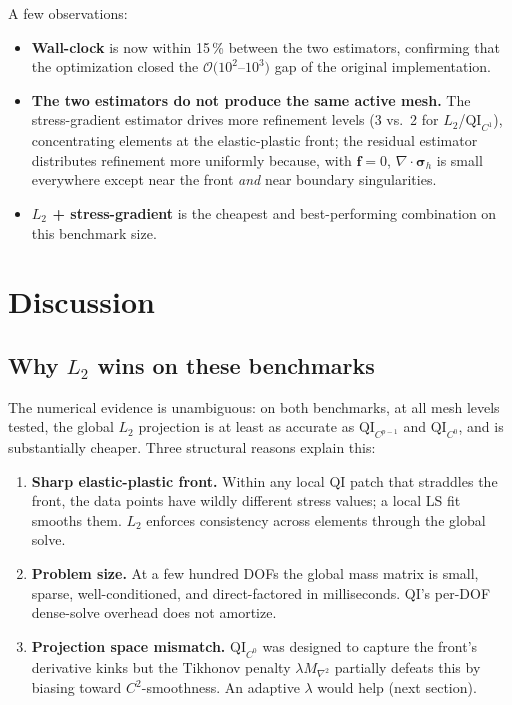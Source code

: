 \documentclass[11pt,a4paper]{article}
\newcommand{\bsigma}{\boldsymbol{\sigma}}
\newcommand{\bff}{\mathbf{f}}
\newcommand{\divg}{\nabla \cdot}
\begin{document}
A few observations:
\begin{itemize}[leftmargin=2em]
    \item \textbf{Wall-clock} is now within 15\,\% between the two
    estimators, confirming that the optimization closed the
    $\mathcal{O}(10^2$--$10^3)$ gap of the original implementation.
    \item \textbf{The two estimators do not produce the same active
    mesh.}  The stress-gradient estimator drives more refinement
    levels (3 vs.~2 for $L_2$/$\mathrm{QI}_{C^1}$), concentrating
    elements at the elastic-plastic front; the residual estimator
    distributes refinement more uniformly because, with $\bff = 0$,
    $\divg\bsigma_h$ is small everywhere except near the front
    \emph{and} near boundary singularities.
    \item \textbf{$L_2$ + stress-gradient} is the cheapest and
    best-performing combination on this benchmark size.
\end{itemize}

\section{Discussion}\label{sec:discussion}

\subsection{Why $L_2$ wins on these benchmarks}

The numerical evidence is unambiguous: on both benchmarks, at all mesh
levels tested, the global $L_2$ projection is at least as accurate as
$\mathrm{QI}_{C^{p-1}}$ and $\mathrm{QI}_{C^0}$, and is substantially
cheaper.  Three structural reasons explain this:

\begin{enumerate}
    \item \textbf{Sharp elastic-plastic front.}  Within any local QI
    patch that straddles the front, the data points have wildly
    different stress values; a local LS fit smooths them.  $L_2$ enforces
    consistency across elements through the global solve.

    \item \textbf{Problem size.}  At a few hundred DOFs the global mass
    matrix is small, sparse, well-conditioned, and direct-factored in
    milliseconds.  QI's per-DOF dense-solve overhead does not amortize.

    \item \textbf{Projection space mismatch.}  $\mathrm{QI}_{C^0}$ was
    designed to capture the front's derivative kinks but the Tikhonov
    penalty $\lambda M_{\nabla^2}$ partially defeats this by biasing
    toward $C^2$-smoothness.  An adaptive $\lambda$ would help (next
    section).
\end{enumerate}
\end{document}
